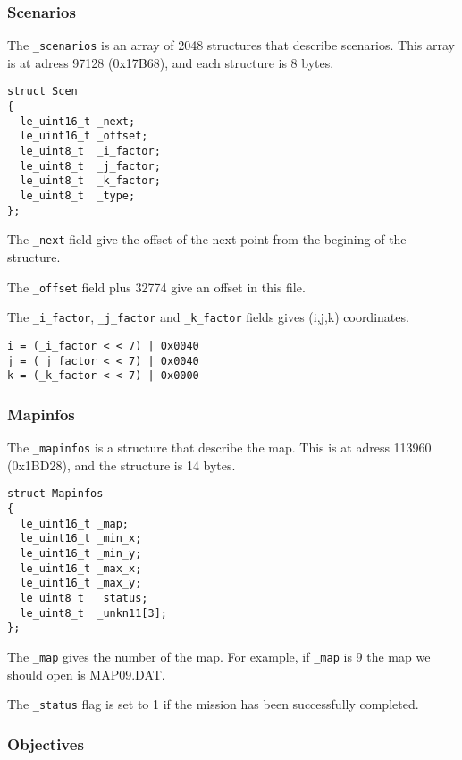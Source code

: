 \documentclass[a4paper,twoside,12pt,dvips]{article}
\begin{document}
\subsubsection{Scenarios}
\label{sec:scenarios}

The \texttt{\_scenarios} is an array of 2048 structures that describe scenarios. This array is at adress 97128 (0x17B68), and each structure is 8 bytes.

\begin{lstlisting}
struct Scen
{
  le_uint16_t _next;
  le_uint16_t _offset;
  le_uint8_t  _i_factor;
  le_uint8_t  _j_factor;
  le_uint8_t  _k_factor;
  le_uint8_t  _type;
};
\end{lstlisting}

The \texttt{\_next} field give the offset of the next point from the begining of the structure.

The \texttt{\_offset} field plus 32774 give an offset in this file.

The \texttt{\_i\_factor}, \texttt{\_j\_factor} and \texttt{\_k\_factor} fields gives (i,j,k) coordinates.
\begin{lstlisting}
i = (_i_factor < < 7) | 0x0040
j = (_j_factor < < 7) | 0x0040
k = (_k_factor < < 7) | 0x0000
\end{lstlisting}


\subsubsection{Mapinfos}
\label{sec:mapinfos}

The \texttt{\_mapinfos} is a structure that describe the map. This is at adress 113960 (0x1BD28), and the structure is 14 bytes.

\begin{lstlisting}
struct Mapinfos
{
  le_uint16_t _map;
  le_uint16_t _min_x;
  le_uint16_t _min_y;
  le_uint16_t _max_x;
  le_uint16_t _max_y;
  le_uint8_t  _status;
  le_uint8_t  _unkn11[3];
};
\end{lstlisting}

The \texttt{\_map} gives the number of the map. For example, if \texttt{\_map} is 9 the map we should open is MAP09.DAT.

The \texttt{\_status} flag is set to 1 if the mission has been successfully completed.

\subsubsection{Objectives}
\label{sec:objectives}
\end{document}
